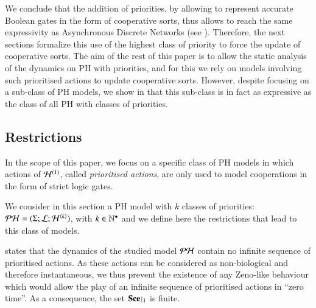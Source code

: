 We conclude that the addition of priorities,
by allowing to represent accurate Boolean gates in the form of cooperative sorts,
thus allows to reach the same expressivity as Asynchronous Discrete Networks
(see ).
Therefore, the next sections 
formalize this use of the highest class of priority
to force the update of cooperative sorts.
The aim of the rest of this paper is to allow the static analysis
of the dynamics on PH with priorities,
and for this we rely on models involving
such prioritised actions to update cooperative sorts.
However, despite focusing on a sub-class of PH models,
we show in 
that this sub-class is in fact as expressive as the class
of all PH with classes of priorities.



\subsection{Restrictions}
\label{ssec:hypothesis}

In the scope of this paper, we focus on a specific class of PH models
in which actions of $\mathcal{H}^{(1)}$, called \emph{prioritised actions},
are only used to model cooperations in the form of strict logic gates.
%

We consider in this section a PH model with $k$ classes of priorities: $\mathcal{PH} = (\Sigma; \mathcal{L}; \mathcal{H}^{\langle k \rangle})$, with $k \in \mathbb{N}^\bullet$
and we define here the restrictions that lead to this class of models.

 states that the dynamics of the studied model $\mathcal{PH}$ contain no infinite sequence of prioritised actions.
As these actions can be considered as non-biological and therefore instantaneous, we thus prevent the existence of any Zeno-like behaviour
which would allow the play of an infinite sequence of prioritised actions in “zero time”.
As a consequence, the set $\restriction{\Sce}{1}$ is finite.

